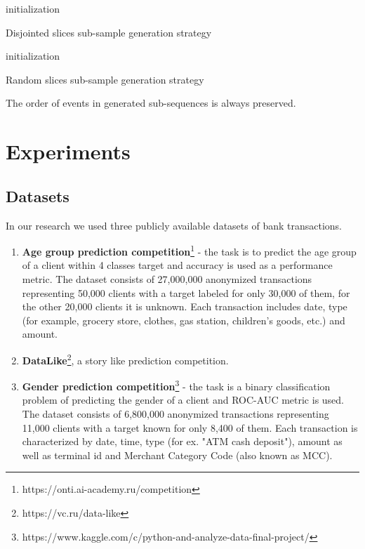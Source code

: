 \documentclass[sigconf]{acmart}
\begin{document}
\begin{algorithm}
\SetAlgoLined
{}
 initialization\;
 \caption{Disjointed slices sub-sample generation strategy}
\label{alg-disj-ss}

\end{algorithm}

\begin{algorithm}
\SetAlgoLined
{}
 initialization\;
 \caption{Random slices sub-sample generation strategy}
\label{alg-slce-ss}
\end{algorithm}

The order of events in generated sub-sequences is always preserved.

\section{Experiments} \label{sec-exp}

\subsection{Datasets} \label{sec-datasets}
In our research we used three publicly available datasets of bank transactions.
\begin{enumerate}
    \item \textbf{Age group prediction competition}\footnote{https://onti.ai-academy.ru/competition} - the task is to predict the age group of a client within 4 classes target and accuracy is used as a performance metric.
    The dataset consists of 27,000,000 anonymized transactions representing 50,000 clients with a target labeled for only 30,000 of them, for the other 20,000 clients it is unknown. Each transaction includes date, type (for example, grocery store, clothes, gas station, children's goods, etc.) and amount. 
    
    \item \textbf{DataLike}\footnote{https://vc.ru/data-like}, a story like prediction competition.
        
    \item \textbf{Gender prediction competition}\footnote{https://www.kaggle.com/c/python-and-analyze-data-final-project/} - the task is a binary classification problem of predicting the gender of a client and ROC-AUC metric is used.
    The dataset consists of 6,800,000 anonymized transactions representing 11,000 clients with a target known for only 8,400 of them. Each transaction is characterized by date, time, type (for ex. "ATM cash deposit"), amount as well as terminal id and Merchant Category Code (also known as MCC).
\end{enumerate}
\end{document}
